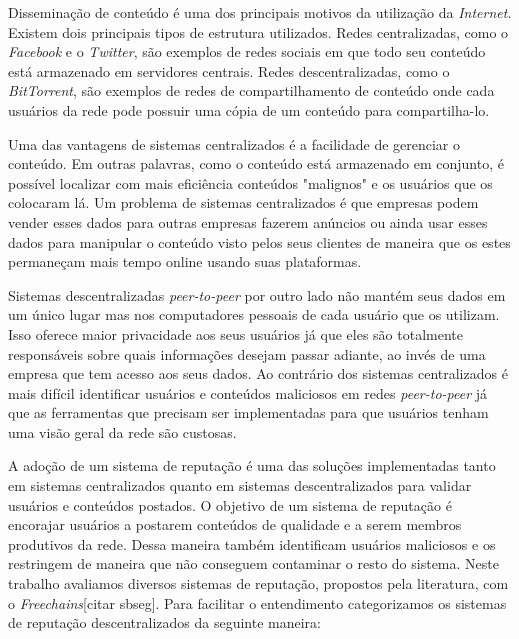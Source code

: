 \documentclass[12pt]{article}
\newcommand{\FC} {\emph{Freechains}\xspace}
\newcommand{\PtoP} {\emph{peer-to-peer}\xspace}
\begin{document}
Disseminação de conteúdo é uma dos principais motivos da utilização da \emph{Internet}. Existem dois principais tipos de estrutura utilizados.  Redes centralizadas, como o \emph{Facebook} e o \emph{Twitter}, são exemplos de redes sociais em que todo seu conteúdo está armazenado em servidores centrais.  Redes descentralizadas, como o \emph{BitTorrent}, são exemplos de redes de compartilhamento de conteúdo onde cada usuários da rede pode possuir uma cópia de um conteúdo para compartilha-lo. 

Uma das vantagens de sistemas centralizados é a facilidade de gerenciar o conteúdo.  Em outras palavras, como o conteúdo está armazenado em conjunto, é possível localizar com mais eficiência conteúdos "malignos" e os usuários que os colocaram lá. %
Um problema de sistemas centralizados é que empresas podem vender esses dados para outras empresas fazerem anúncios ou ainda usar esses dados para manipular o conteúdo visto pelos seus clientes de maneira que os estes permaneçam mais tempo online usando suas plataformas. %

Sistemas descentralizadas \PtoP por outro lado não mantém seus dados em um único lugar mas nos computadores pessoais de cada usuário que os utilizam.  Isso oferece maior privacidade aos seus usuários já que eles são totalmente responsáveis sobre quais informações desejam passar adiante, ao invés de uma empresa que tem acesso aos seus dados. %
Ao contrário dos sistemas centralizados é mais difícil identificar usuários e conteúdos maliciosos em redes \PtoP já que as ferramentas que precisam ser implementadas para que usuários tenham uma visão geral da rede são custosas. 

A adoção de um sistema de reputação é uma das soluções implementadas tanto em sistemas centralizados quanto em sistemas descentralizados para validar usuários e conteúdos postados.  O objetivo de um sistema de reputação é encorajar usuários a postarem conteúdos de qualidade e a serem membros produtivos da rede. Dessa maneira também identificam usuários maliciosos e os restringem de maneira que não conseguem contaminar o resto do sistema.  Neste trabalho avaliamos diversos sistemas de reputação, propostos pela literatura, com o \FC [citar sbseg].  Para facilitar o entendimento categorizamos os sistemas de reputação descentralizados da seguinte maneira:
\end{document}

